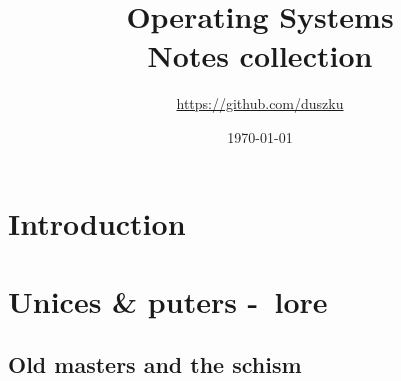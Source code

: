 \documentclass[a4paper,oneside]{book}
\title{Operating Systems\\\large{Notes collection}}
\author{\href{https://github.com/duszku}{https://github.com/duszku}}
\date{\today}
\begin{document}
    \maketitle
    \tableofcontents

    \chapter{Introduction}
    

    \chapter{Unices \& puters -~lore}
    \section{Old masters and the schism}
    
\end{document}
